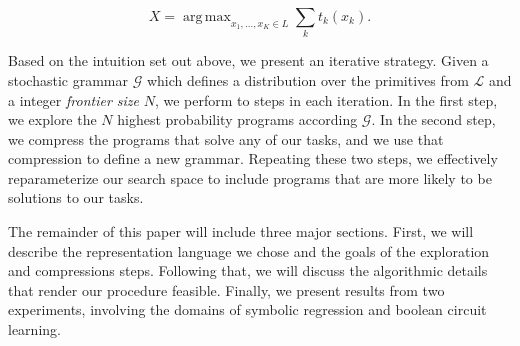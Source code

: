 \documentclass{article}
\DeclareMathOperator*{\argmax}{arg\,max}
\begin{document}
\[
X = \argmax_{x_1, \dots, x_K \in L} \sum_k t_k(x_k).
\]

Based on the intuition set out above, we present an iterative
strategy. Given a stochastic grammar $\mathcal{G}$ which defines a
distribution over the primitives from $\mathcal{L}$ and a integer
\emph{frontier size} $N$, we perform to steps in each iteration.  In
the first step, we explore the $N$ highest probability programs
according $\mathcal{G}$. In the second step, we compress the
programs that solve any of our tasks, and we use that compression to
define a new grammar. Repeating these two steps, we effectively
reparameterize our search space to include programs that are more likely
to be solutions to our tasks. 

The remainder of this paper will include three major sections. First,
we will describe the representation language we chose and the goals of
the exploration and compressions steps. Following that, we will
discuss the algorithmic details that render our procedure
feasible. Finally, we present results from two experiments, involving
the domains of symbolic regression and boolean circuit learning.




\end{document}
